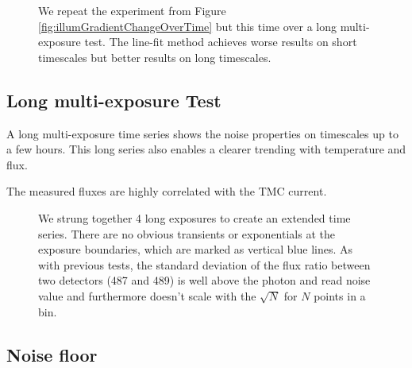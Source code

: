 \documentclass{aastex62}
\begin{document}
\begin{figure}
\caption{We repeat the experiment from Figure \ref{fig:illumGradientChangeOverTime} but this time over a long multi-exposure test. The line-fit method achieves worse results on short timescales but better results on long timescales.}\label{fig:illumGradientChangeOverTimeMultiExpBaseline}
\end{figure}


\clearpage

\subsection{Long multi-exposure Test}
A long multi-exposure time series shows the noise properties on timescales up to a few hours.
This long series also enables a clearer trending with temperature and flux.

The measured fluxes are highly correlated with the TMC current.

\begin{figure}
{}
\caption{We strung together 4 long exposures to create an extended time series.
There are no obvious transients or exponentials at the exposure boundaries, which are marked as vertical blue lines.
As with previous tests, the standard deviation of the flux ratio between two detectors (487 and 489) is well above the photon and read noise value and furthermore doesn't scale with the $\sqrt{N}$ for $N$ points in a bin.
}\label{fig:AZlab06LongMultiExp}
\end{figure}




\clearpage
\subsection{Noise floor}
\end{document}
